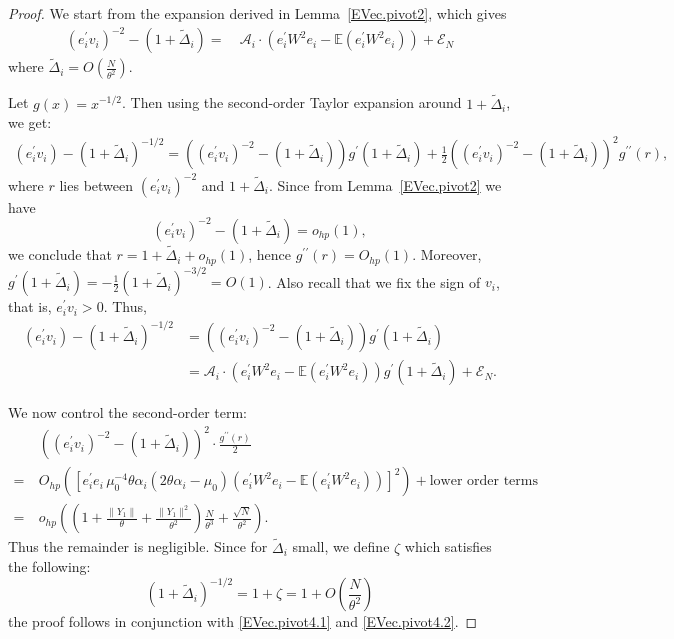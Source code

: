 \documentclass[11pt, reqno]{amsart}
\numberwithin{equation}{section}
\begin{document}
\begin{proof}

We start from the expansion derived in Lemma~\ref{EVec.pivot2}, which gives
\begin{align}
\nonumber (e_i^\prime v_i)^{-2} - (1 + \tilde\Delta_i) = \ & \mathcal A_i\cdot (e_i^\prime W^2 e_i - \mathbb{E}(e_i^\prime W^2 e_i)) +\mathcal E_N
\end{align}
where \( \tilde\Delta_i = O\left(\frac{N}{\theta^2}\right) \).

\medskip

Let \( g(x) = x^{-1/2} \). Then using the second-order Taylor expansion around \( 1 + \tilde\Delta_i \), we get:
\begin{align*}
(e_i^\prime v_i) - (1 + \tilde\Delta_i)^{-1/2} =  ((e_i^\prime v_i)^{-2} - (1 + \tilde\Delta_i)) g^\prime(1 +\tilde\Delta_i) 
 + \frac{1}{2} ((e_i^\prime v_i)^{-2} - (1 + \tilde\Delta_i))^2 g^{\prime\prime}(r),
\end{align*}
where \( r \) lies between \( (e_i^\prime v_i)^{-2} \) and \( 1 + \tilde\Delta_i \). Since from Lemma~\ref{EVec.pivot2} we have
\[ (e_i^\prime v_i)^{-2} - (1 + \tilde\Delta_i) = o_{hp}(1), \]
we conclude that \( r = 1 + \tilde\Delta_i + o_{hp}(1) \), hence \(g^{\prime\prime}(r) = O_{hp}(1)\). Moreover, \( g^\prime(1 + \tilde\Delta_i) = -\tfrac{1}{2}(1 + \tilde\Delta_i)^{-3/2} = O(1) \). Also recall that we fix the sign of $v_i$, that is, $e_i^\prime v_i>0$. Thus,
\begin{align}
(e_i^\prime v_i) - (1 + \tilde\Delta_i)^{-1/2}&= ((e_i^\prime v_i)^{-2} - (1 + \tilde\Delta_i)) g^\prime(1 + \tilde\Delta_i)\nonumber\\
&=\mathcal A_i\cdot(e_i^\prime W^2 e_i - \mathbb{E}(e_i^\prime W^2 e_i)) 
\label{EVec.pivot4.1} g^\prime(1 + \tilde\Delta_i) + \mathcal{E}_N.
\end{align}


We now control the second-order term:
\begin{align}
& ((e_i^\prime v_i)^{-2} - (1 + \tilde\Delta_i))^2 \cdot \frac{g^{\prime\prime}(r)}{2} \nonumber\\
=\ & O_{hp}\left(\left[ e_i^\prime e_i\, \mu_0^{-4} \theta \alpha_i (2\theta \alpha_i - \mu_0)(e_i^\prime W^2 e_i - \mathbb{E}(e_i^\prime W^2 e_i)) \right]^2\right) + \text{lower order terms} \nonumber\\
=\ & o_{hp}\left(\left(1 + \frac{\|Y_1\|}{\theta} + \frac{\|Y_1\|^2}{\theta^2}\right)\frac{N}{\theta^3} + \frac{\sqrt{N}}{\theta^2}\right).\label{EVec.pivot4.2}
\end{align}
Thus the remainder is negligible.
Since for $\tilde\Delta_i$ small, we define $\zeta$ which satisfies the following:
\[
(1+ \tilde\Delta_i)^{-1/2} = 1 + \zeta = 1 + O\left(\frac{N}{\theta^2}\right) 
\]the proof follows in conjunction with \eqref{EVec.pivot4.1} and \eqref{EVec.pivot4.2}.
\end{proof}
\end{document}
